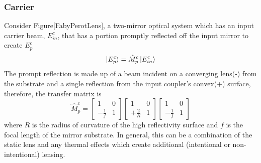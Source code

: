 		\subsubsection{Carrier}
		Consider Figure[FabyPerotLens], a two-mirror optical system which has an input carrier beam, $E^c_{in}$, that has a portion promptly reflected off the input mirror to create $E^c_{p}$
		\begin{equation}
		\ket{E^{c}_{p}} = \hat{M}^{c}_{p} \ket{E^{c}_{in}}
		\end{equation}
		The prompt reflection is made up of a beam incident on a converging lens(-) from the substrate and a single reflection from the input coupler's convex(+) surface, therefore, the transfer matrix is
		\begin{equation}
		\hat{M}^{c}_{p} = 
		\begin{bmatrix}
						1 	&	0 
		\\ 	-\frac{1}{f} 	&	1
		\end{bmatrix}
		\begin{bmatrix}
						1 	&	0 
		\\ 	+\frac{2}{R} 	&	1
		\end{bmatrix}
		\begin{bmatrix}
						1 	&	0 
		\\ 	-\frac{1}{f} 	&	1
		\end{bmatrix}
		\end{equation}
		where $R$ is the radius of curvature of the high reflectivity surface and $f$ is the focal length of the mirror substrate. In general, this can be a combination of the static lens and any thermal effects which create additional (intentional or non-intentional) lensing.
		
